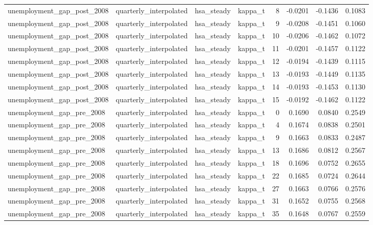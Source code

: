 \begin{tabular}{llllrrrr}
unemployment\_gap\_post\_2008 & quarterly\_interpolated & hsa\_steady & kappa\_t & 8 & -0.0201 & -0.1436 & 0.1083 \\
unemployment\_gap\_post\_2008 & quarterly\_interpolated & hsa\_steady & kappa\_t & 9 & -0.0208 & -0.1451 & 0.1060 \\
unemployment\_gap\_post\_2008 & quarterly\_interpolated & hsa\_steady & kappa\_t & 10 & -0.0206 & -0.1462 & 0.1072 \\
unemployment\_gap\_post\_2008 & quarterly\_interpolated & hsa\_steady & kappa\_t & 11 & -0.0201 & -0.1457 & 0.1122 \\
unemployment\_gap\_post\_2008 & quarterly\_interpolated & hsa\_steady & kappa\_t & 12 & -0.0194 & -0.1439 & 0.1115 \\
unemployment\_gap\_post\_2008 & quarterly\_interpolated & hsa\_steady & kappa\_t & 13 & -0.0193 & -0.1449 & 0.1135 \\
unemployment\_gap\_post\_2008 & quarterly\_interpolated & hsa\_steady & kappa\_t & 14 & -0.0193 & -0.1453 & 0.1130 \\
unemployment\_gap\_post\_2008 & quarterly\_interpolated & hsa\_steady & kappa\_t & 15 & -0.0192 & -0.1462 & 0.1122 \\
unemployment\_gap\_pre\_2008 & quarterly\_interpolated & hsa\_steady & kappa\_t & 0 & 0.1690 & 0.0840 & 0.2549 \\
unemployment\_gap\_pre\_2008 & quarterly\_interpolated & hsa\_steady & kappa\_t & 4 & 0.1674 & 0.0838 & 0.2501 \\
unemployment\_gap\_pre\_2008 & quarterly\_interpolated & hsa\_steady & kappa\_t & 9 & 0.1663 & 0.0833 & 0.2487 \\
unemployment\_gap\_pre\_2008 & quarterly\_interpolated & hsa\_steady & kappa\_t & 13 & 0.1686 & 0.0812 & 0.2567 \\
unemployment\_gap\_pre\_2008 & quarterly\_interpolated & hsa\_steady & kappa\_t & 18 & 0.1696 & 0.0752 & 0.2655 \\
unemployment\_gap\_pre\_2008 & quarterly\_interpolated & hsa\_steady & kappa\_t & 22 & 0.1685 & 0.0724 & 0.2644 \\
unemployment\_gap\_pre\_2008 & quarterly\_interpolated & hsa\_steady & kappa\_t & 27 & 0.1663 & 0.0766 & 0.2576 \\
unemployment\_gap\_pre\_2008 & quarterly\_interpolated & hsa\_steady & kappa\_t & 31 & 0.1652 & 0.0755 & 0.2568 \\
unemployment\_gap\_pre\_2008 & quarterly\_interpolated & hsa\_steady & kappa\_t & 35 & 0.1648 & 0.0767 & 0.2559 \\

\end{tabular}
